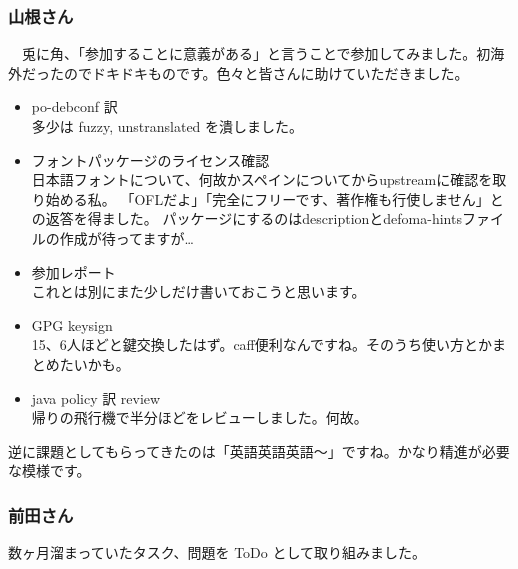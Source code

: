 \documentclass[mingoth,a4paper]{jsarticle}
\begin{document}
\subsubsection{山根さん}

　兎に角、「参加することに意義がある」と言うことで参加してみました。初海外だったのでドキドキものです。色々と皆さんに助けていただきました。

\begin{itemize}
 
 \item po-debconf 訳\\
       多少は fuzzy, unstranslated を潰しました。
 \item フォントパッケージのライセンス確認\\
       日本語フォントについて、何故かスペインについてからupstreamに確認を取り始める私。
       「OFLだよ」「完全にフリーです、著作権も行使しません」との返答を得ました。
       パッケージにするのはdescriptionとdefoma-hintsファイルの作成が待ってますが…
 \item 参加レポート\\
       これとは別にまた少しだけ書いておこうと思います。
 \item GPG keysign\\
       15、6人ほどと鍵交換したはず。caff便利なんですね。そのうち使い方とかまとめたいかも。
 \item java policy 訳 review\\
       帰りの飛行機で半分ほどをレビューしました。何故。
\end{itemize}

 逆に課題としてもらってきたのは「英語英語英語〜」ですね。かなり精進が必要な模様です。

\subsubsection{前田さん}

数ヶ月溜まっていたタスク、問題を ToDo として取り組みました。
\end{document}
